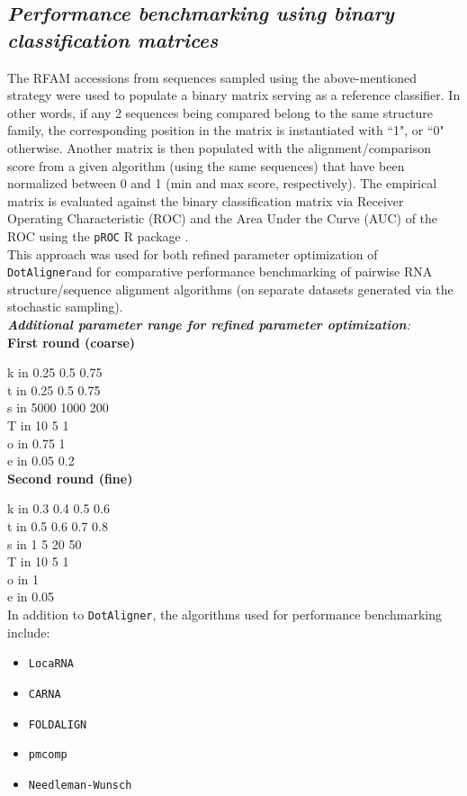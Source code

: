 \documentclass[a4paper,twoside]{article}
\newcommand\dotaligner{\texttt{DotAligner}}
\newcommand\pmcomp{\texttt{pmcomp}}
\newcommand\locarna{\texttt{LocaRNA}}
\newcommand\foldalign{\texttt{FOLDALIGN}}
\newcommand\carna{\texttt{CARNA}}
\newcommand\nw{\texttt{Needleman-Wunsch}}
\begin{document}
\subsection{\textit{ Performance benchmarking using binary classification matrices}}
The RFAM accessions from sequences sampled using the above-mentioned strategy were used to populate a binary matrix 
serving as a reference classifier. In other words, if any 2 sequences being compared belong to the same structure family,
the corresponding position in the matrix is instantiated with ``1", or ``0" otherwise. Another matrix is then populated with the 
alignment/comparison score from a given algorithm  (using the same sequences) that have been normalized between 0 and 1 
(min and max score, respectively). The empirical matrix is evaluated against the binary classification matrix via Receiver 
Operating Characteristic (ROC) and the Area Under the Curve (AUC) of the ROC using the \texttt{pROC} R package \cite{robin2011proc}. \\

This approach was used for both refined parameter optimization of \dotaligner  and for comparative performance benchmarking of pairwise RNA structure/sequence alignment algorithms (on separate datasets generated via the stochastic sampling). \\

\noindent \textit{\textbf{Additional parameter range for refined parameter optimization}:}\\
\noindent \textbf{First round (coarse)}

\noindent k in 0.25 0.5 0.75\\
t in 0.25 0.5 0.75\\
s in 5000 1000 200\\
T in 10 5 1\\
o in 0.75 1\\
e in 0.05 0.2\\

\noindent \textbf{Second round (fine)}

\noindent  k in 0.3 0.4 0.5 0.6 \\
t in 0.5 0.6 0.7 0.8 \\
s in 1 5 20 50 \\
T in 10 5 1\\
o in 1\\
e in 0.05\\

In addition to \dotaligner{}, the algorithms 
used for performance benchmarking include: 
\begin{itemize}
\item \locarna{} 
\item \carna{}
\item \foldalign{}
\item \pmcomp{}
\item \nw{} 
\end{itemize}
\end{document}
